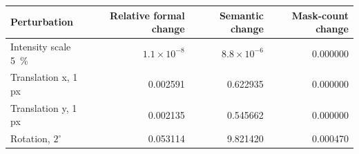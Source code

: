 \setcounter{table}{6}\label{tab:perturbation_summary}
\begin{tabular}{lrrr}
\toprule
Perturbation & Relative formal change & Semantic change & Mask-count change \\
\midrule
Intensity scale 5~\% & \(1.1\times10^{-8}\) & \(8.8\times10^{-6}\) & 0.000000 \\
Translation x, 1 px & 0.002591 & 0.622935 & 0.000000 \\
Translation y, 1 px & 0.002135 & 0.545662 & 0.000000 \\
Rotation, \(2^\circ\) & 0.053114 & 9.821420 & 0.000470 \\
\bottomrule
\end{tabular}
